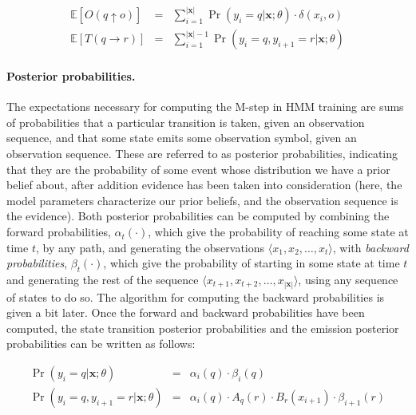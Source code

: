 \begin{eqnarray}
\label{eq:chapter6_ex1} \mathbb{E}[O(q \uparrow o)]& =& \sum_{i=1}^{|\textbf{x}|} \Pr(y_i = q | \textbf{x}; \theta) \cdot \delta(x_i,o) \\
\label{eq:chapter6_ex1a} \mathbb{E}[T(q \rightarrow r)] & = & \sum_{i=1}^{|\textbf{x}|-1} \Pr(y_i = q , y_{i+1} = r | \textbf{x}; \theta)
\end{eqnarray}

\paragraph{\textbf{Posterior probabilities.}}

The expectations necessary for computing the M-step in HMM training
are sums of probabilities that a particular transition is taken, given
an observation sequence, and that some state emits some observation
symbol, given an observation sequence.  These are referred to as
posterior probabilities, indicating that they are the probability of
some event whose distribution we have a prior belief about, after
addition evidence has been taken into consideration (here, the model
parameters characterize our prior beliefs, and the observation
sequence is the evidence).  Both posterior probabilities can be
computed by combining the forward probabilities, $\alpha_t(\cdot)$,
which give the probability of reaching some state at time $t$, by any
path, and generating the observations $\langle x_1, x_2, \ldots , x_t
\rangle$, with \emph{backward probabilities}, $\beta_t(\cdot)$, which
give the probability of starting in some state at time $t$ and
generating the rest of the sequence $\langle x_{t+1}, x_{t+2}, \ldots
, x_{|\textbf{x}|} \rangle$, using any sequence of states to do so.
The algorithm for computing the backward probabilities is given a bit
later.  Once the forward and backward probabilities have been
computed, the state transition posterior probabilities and the
emission posterior probabilities can be written as follows:

\begin{eqnarray}
\label{eq:chapter6_stateocprob} \Pr(y_i = q | \textbf{x}; \theta) & = & \alpha_i(q) \cdot \beta_i(q) \\
\Pr(y_i = q , y_{i+1} = r | \textbf{x}; \theta) & = & \alpha_i(q) \cdot A_q(r) \cdot B_r(x_{i+1}) \cdot \beta_{i+1}(r) \label{eq:chapter6_transprob}
\end{eqnarray}

